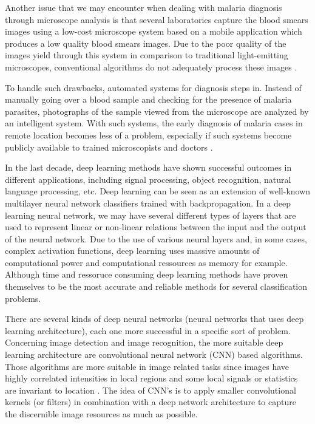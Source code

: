 Another issue that we may encounter when dealing with malaria diagnosis through microscope analysis is that several laboratories capture the blood smears images using a low-cost microscope system based on a mobile application which produces a low quality blood smears images. Due to the poor quality of the images yield through this system in comparison to traditional light-emitting microscopes, conventional algorithms do not adequately process these images \cite{Sorgedrager2018}.  

To handle such drawbacks, automated systems for diagnosis
steps in. Instead of manually going over a blood sample and
checking for the presence of malaria parasites, photographs
of the sample viewed from the microscope are analyzed by
an intelligent system. With such systems, the early diagnosis of malaria cases in remote location becomes less of a problem, especially if such systems become publicly available to trained microscopists and doctors \cite{Premaratne2006AFilms}\cite{Penas2017}.

In the last decade, deep learning methods have shown successful outcomes in different applications, including signal processing, object recognition, natural language processing, etc. Deep learning can be seen as an extension of well-known multilayer neural network classifiers trained with backpropagation. In a deep learning neural network, we may have several different types of layers that are used to represent linear or non-linear relations between the input and the output of the neural network. Due to the use of various neural layers and, in some cases, complex activation functions, deep learning uses massive amounts of computational power and computational ressources as memory for example. Although time and ressoruce consuming deep learning methods have proven themselves to be the most accurate and reliable methods for several classification problems.

There are several kinds of deep neural networks (neural networks that uses deep learning architecture), each one more successful in a specific sort of problem. Concerning image detection and image recognition, the more suitable deep learning architecture are convolutional neural network (CNN) based algorithms. Those algorithms are more suitable in image related tasks since images have highly correlated intensities in local regions and some local signals or statistics are invariant to location \cite{Yan2017Multi-InstanceRecognition}. The idea of CNN's is to apply smaller convolutional kernels (or filters) in combination with a deep network architecture to capture the discernible image resources as much as possible. 

